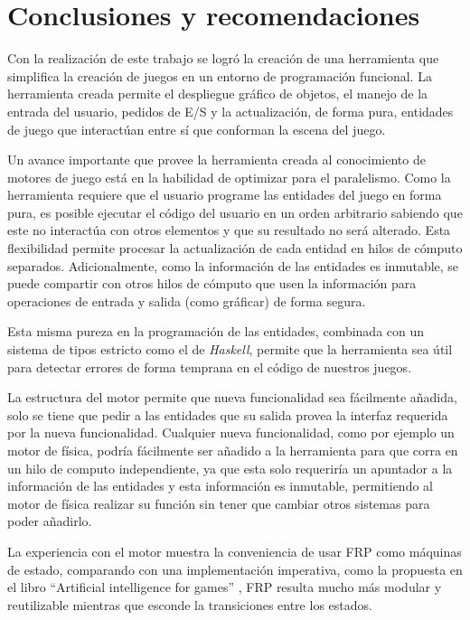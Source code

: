 
\chapter{Conclusiones y recomendaciones}
\label{capitulo6}

Con la realización de este trabajo se logró la creación de una herramienta que simplifica la creación de juegos en un entorno de programación funcional. La herramienta creada permite el despliegue gráfico de objetos, el manejo de la entrada del usuario, pedidos de E/S y la actualización, de forma pura, entidades de juego que interactúan entre sí que conforman la escena del juego.

Un avance importante que provee la herramienta creada al conocimiento de motores de juego está en la habilidad de optimizar para el paralelismo. Como la herramienta requiere que el usuario programe las entidades del juego en forma pura, es posible ejecutar el código del usuario en un orden arbitrario sabiendo que este no interactúa con otros elementos y que su resultado no será alterado. Esta flexibilidad permite procesar la actualización de cada entidad en hilos de cómputo separados. Adicionalmente, como la información de las entidades es inmutable, se puede compartir con otros hilos de cómputo que usen la información para operaciones de entrada y salida (como gráficar) de forma segura.

Esta misma pureza en la programación de las entidades, combinada con un sistema de tipos estricto como el de \emph{Haskell}, permite que la herramienta sea útil para detectar errores de forma temprana en el código de nuestros juegos.

La estructura del motor permite que nueva funcionalidad  sea fácilmente añadida, solo se tiene que pedir a las entidades que su salida provea la interfaz requerida por la nueva funcionalidad. Cualquier nueva funcionalidad, como por ejemplo un motor de física, podría fácilmente ser añadido a la herramienta para que corra en un hilo de computo independiente, ya que esta solo requeriría un apuntador a la información de las entidades y esta información es inmutable, permitiendo al motor de física realizar su función sin tener que cambiar otros sistemas para poder añadirlo.

La experiencia con el motor muestra la conveniencia de usar FRP como máquinas de estado, comparando con una implementación imperativa, como la propuesta en el libro “Artificial intelligence for games” \cite{millington2016artificial}, FRP resulta mucho más modular y reutilizable mientras que esconde la transiciones entre los estados.

